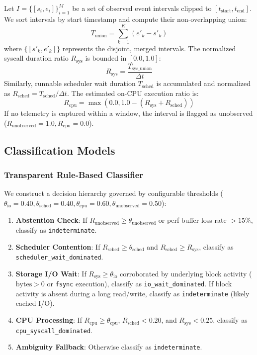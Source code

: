 \documentclass[conference]{IEEEtran}
\begin{document}
Let $I = \{[s_i, e_i]\}_{i=1}^M$ be a set of observed event intervals clipped to $[t_{\text{start}}, t_{\text{end}}]$. We sort intervals by start timestamp and compute their non-overlapping union:
\begin{equation}
    T_{\text{union}} = \sum_{k=1}^K (e'_k - s'_k)
\end{equation}
where $\{[s'_k, e'_k]\}$ represents the disjoint, merged intervals. The normalized syscall duration ratio $R_{\text{sys}}$ is bounded in $[0.0, 1.0]$:
\begin{equation}
    R_{\text{sys}} = \frac{T_{\text{sys\_union}}}{\Delta t}
\end{equation}
Similarly, runnable scheduler wait duration $T_{\text{sched}}$ is accumulated and normalized as $R_{\text{sched}} = T_{\text{sched}} / \Delta t$. The estimated on-CPU execution ratio is:
\begin{equation}
    R_{\text{cpu}} = \max\left(0.0, 1.0 - (R_{\text{sys}} + R_{\text{sched}})\right)
\end{equation}
If no telemetry is captured within a window, the interval is flagged as unobserved ($R_{\text{unobserved}} = 1.0, R_{\text{cpu}} = 0.0$).

\subsection{Classification Models}
\subsubsection{Transparent Rule-Based Classifier}
We construct a decision hierarchy governed by configurable thresholds ($\theta_{\text{io}} = 0.40, \theta_{\text{sched}} = 0.40, \theta_{\text{cpu}} = 0.60, \theta_{\text{unobserved}} = 0.50$):
\begin{enumerate}
    \item \textbf{Abstention Check}: If $R_{\text{unobserved}} \ge \theta_{\text{unobserved}}$ or perf buffer loss rate $> 15\%$, classify as \texttt{indeterminate}.
    \item \textbf{Scheduler Contention}: If $R_{\text{sched}} \ge \theta_{\text{sched}}$ and $R_{\text{sched}} \ge R_{\text{sys}}$, classify as \texttt{scheduler\_wait\_dominated}.
    \item \textbf{Storage I/O Wait}: If $R_{\text{sys}} \ge \theta_{\text{io}}$ corroborated by underlying block activity ($\text{bytes} > 0$ or \texttt{fsync} execution), classify as \texttt{io\_wait\_dominated}. If block activity is absent during a long read/write, classify as \texttt{indeterminate} (likely cached I/O).
    \item \textbf{CPU Processing}: If $R_{\text{cpu}} \ge \theta_{\text{cpu}}$, $R_{\text{sched}} < 0.20$, and $R_{\text{sys}} < 0.25$, classify as \texttt{cpu\_syscall\_dominated}.
    \item \textbf{Ambiguity Fallback}: Otherwise classify as \texttt{indeterminate}.
\end{enumerate}
\end{document}
